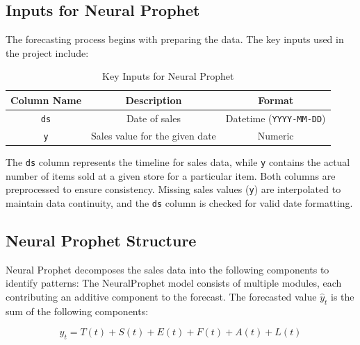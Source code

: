 \subsection{Inputs for Neural Prophet}

The forecasting process begins with preparing the data. The key inputs used in the project include:

\begin{table}[h!]
    \centering
    \begin{tabular}{|c|c|c|}
        \hline
        \textbf{Column Name} & \textbf{Description}           & \textbf{Format}                \\
        \hline
        \texttt{ds}          & Date of sales                  & Datetime (\texttt{YYYY-MM-DD}) \\
        \hline
        \texttt{y}           & Sales value for the given date & Numeric                        \\
        \hline
    \end{tabular}
    \caption{Key Inputs for Neural Prophet}
\end{table}

The \texttt{ds} column represents the timeline for sales data, while \texttt{y} contains the actual number of items sold at a given store for a particular item. Both columns are preprocessed to ensure consistency. Missing sales values (\texttt{y}) are interpolated to maintain data continuity, and the \texttt{ds} column is checked for valid date formatting.

\subsection{Neural Prophet Structure}

Neural Prophet decomposes the sales data into the following components to identify patterns:
The NeuralProphet model consists of multiple modules, each contributing an additive component to the forecast. The forecasted value \( \hat{y}_t \) is the sum of the following components:

\begin{equation}
    \hat{y}_t = T(t) + S(t) + E(t) + F(t) + A(t) + L(t)
\end{equation}

